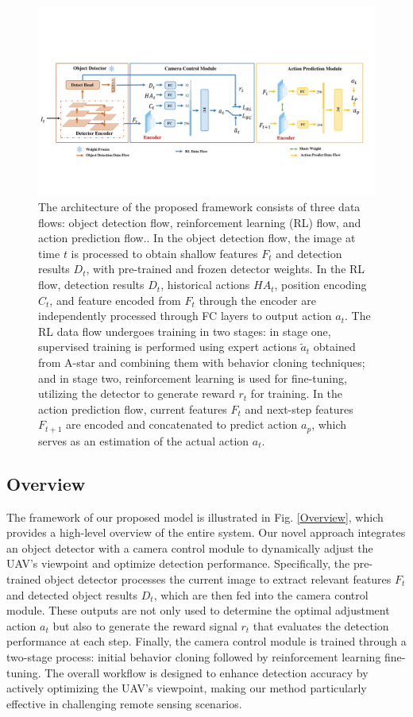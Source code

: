 \documentclass[lettersize,journal]{IEEEtran}
\begin{document}
\begin{figure}[!ht]
	\centering
	\includegraphics[clip=true, width=1.0\textwidth]{fig/overview2.pdf}
	\caption{The architecture of the proposed framework consists of three data flows: object detection flow, reinforcement learning (RL) flow, and action prediction flow..  In the object detection flow, the image at time $t$ is processed to obtain shallow features $F_t$ and detection results $D_t$, with pre-trained and frozen detector weights.  In the RL flow, detection results $D_t$, historical actions ${HA}_t$, position encoding $C_t$, and feature encoded from $F_t$ through the encoder are independently processed through FC layers to output action $a_t$.  The RL data flow undergoes training in two stages: in stage one, supervised training is performed using expert actions $\tilde{a}_t$ obtained from A-star and combining them with behavior cloning techniques;  and in stage two, reinforcement learning is used for fine-tuning, utilizing the detector to generate reward $r_t$ for training.  In the action prediction flow, current features $F_t$ and next-step features $F_{t+1}$ are encoded and concatenated to predict action $a_p$, which serves as an estimation of the actual action $a_t$.}
	\label{Architecture}
\end{figure}

\subsection{Overview}
The framework of our proposed model is illustrated in Fig. \ref{Overview}, which provides a high-level overview of the entire system. Our novel approach integrates an object detector with a camera control module to dynamically adjust the UAV's viewpoint and optimize detection performance. Specifically, the pre-trained object detector processes the current image to extract relevant features $F_t$ and detected object results $D_t$, which are then fed into the camera control module. These outputs are not only used to determine the optimal adjustment action $a_t$ but also to generate the reward signal $r_t$ that evaluates the detection performance at each step. Finally, the camera control module is trained through a two-stage process: initial behavior cloning followed by reinforcement learning fine-tuning. The overall workflow is designed to enhance detection accuracy by actively optimizing the UAV's viewpoint, making our method particularly effective in challenging remote sensing scenarios.
\end{document}
